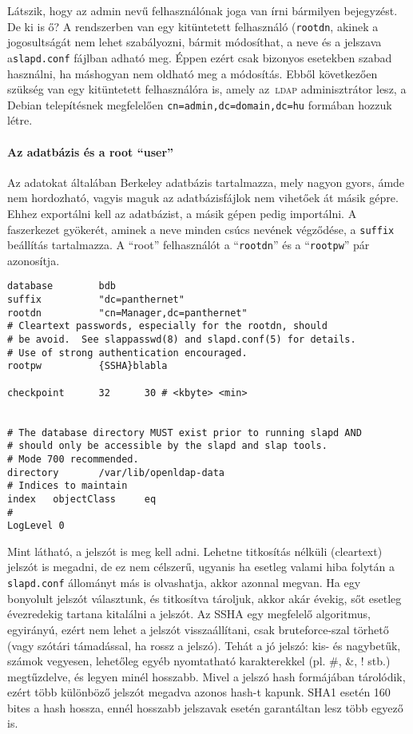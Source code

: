 Látszik, hogy az admin nevű felhasználónak joga van írni bármilyen bejegyzést. De ki is ő? A rendszerben van egy
kitüntetett felhasználó (\texttt{rootdn}, akinek a jogosultságát nem lehet szabályozni, bármit módosíthat, a
neve és a jelszava a\texttt{slapd.conf} fájlban adható meg. Éppen ezért csak bizonyos esetekben szabad használni, ha
máshogyan nem oldható meg a módosítás. Ebből következően szükség van egy kitüntetett felhasználóra is, amely az~\textsc{ldap}
adminisztrátor lesz, a Debian telepítésnek megfelelően \texttt{cn=admin,dc=domain,dc=hu} formában hozzuk létre.


\paragraph{Az adatbázis és a root ``user''} Az adatokat általában Berkeley adatbázis tartalmazza, mely nagyon
gyors, ámde nem hordozható, vagyis maguk az adatbázisfájlok nem vihetőek át másik gépre. Ehhez exportálni kell az
adatbázist, a másik gépen pedig importálni. A faszerkezet gyökerét, aminek a neve minden csúcs nevének végződése, a
\texttt{suffix} beállítás tartalmazza. A ``root'' felhasználót a ``\texttt{rootdn}'' és a ``\texttt{rootpw}'' pár
azonosítja.

\begin{Verbatim}[frame=single]
database        bdb
suffix          "dc=panthernet"
rootdn          "cn=Manager,dc=panthernet"
# Cleartext passwords, especially for the rootdn, should
# be avoid.  See slappasswd(8) and slapd.conf(5) for details.
# Use of strong authentication encouraged.
rootpw          {SSHA}blabla

checkpoint      32      30 # <kbyte> <min>


# The database directory MUST exist prior to running slapd AND
# should only be accessible by the slapd and slap tools.
# Mode 700 recommended.
directory       /var/lib/openldap-data
# Indices to maintain
index   objectClass     eq
#
LogLevel 0
\end{Verbatim}


Mint látható, a jelszót is meg kell adni. Lehetne titkosítás nélküli (cleartext) jelszót is megadni, de ez nem
célszerű, ugyanis ha esetleg valami hiba folytán a \texttt{slapd.conf} állományt más is olvashatja, akkor azonnal
megvan. Ha egy bonyolult jelszót választunk, és titkosítva tároljuk, akkor akár évekig, sőt esetleg évezredekig
tartana kitalálni a jelszót. Az \textsc{SSHA} egy megfelelő algoritmus, egyirányú, ezért
nem lehet a jelszót visszaállítani, csak bruteforce-szal törhető (vagy szótári támadással, ha rossz a jelszó). Tehát a
jó jelszó: kis-  és nagybetűk, számok vegyesen, lehetőleg egyéb nyomtatható karakterekkel (pl. \#, \&, ! stb.)
megtűzdelve, és legyen minél hosszabb. Mivel a jelszó hash formájában tárolódik, ezért több különböző jelszót megadva
azonos hash-t kapunk. \textsc{SHA1} esetén 160 bites a hash hossza, ennél hosszabb jelszavak esetén garantáltan lesz több
egyező is.


